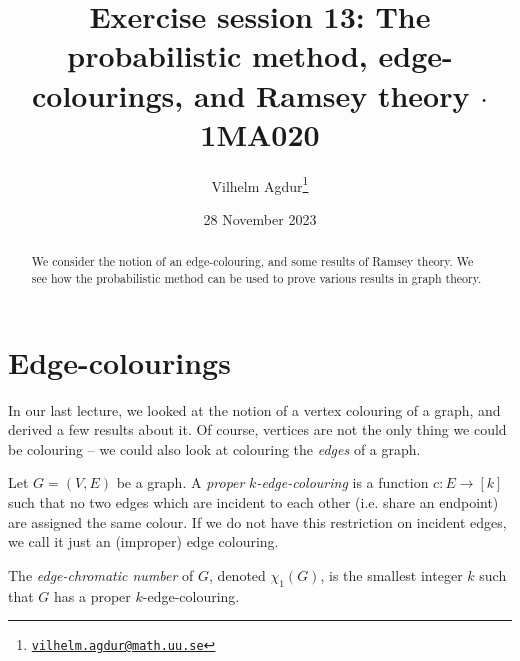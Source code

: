 \documentclass[nobib]{tufte-handout}
\title{Exercise session 13: The probabilistic method, edge-colourings, and Ramsey theory $\cdot$ 1MA020}
\author[Vilhelm Agdur]{Vilhelm Agdur\thanks{\href{mailto:vilhelm.agdur@math.uu.se}{\nolinkurl{vilhelm.agdur@math.uu.se}}}}
\date{28 November 2023}
\begin{document}
\maketitle%

\begin{abstract}
\noindent
We consider the notion of an edge-colouring, and some results of Ramsey theory. We see how the probabilistic method can be used to prove various results in graph theory.
\end{abstract}

\section{Edge-colourings}

In our last lecture, we looked at the notion of a vertex colouring of a graph, and derived a few results about it. Of course, vertices are not the only thing we could be colouring -- we could also look at colouring the \emph{edges} of a graph.

\begin{definition}
    Let $G = (V,E)$ be a graph. A \emph{proper} \emph{$k$-edge-colouring} is a function $c: E \to [k]$ such that no two edges which are incident to each other (i.e. share an endpoint) are assigned the same colour. If we do not have this restriction on incident edges, we call it just an (improper) edge colouring.

    The \emph{edge-chromatic number} of $G$, denoted $\chi_1(G)$, is the smallest integer $k$ such that $G$ has a proper $k$-edge-colouring.
\end{definition}
\end{document}
